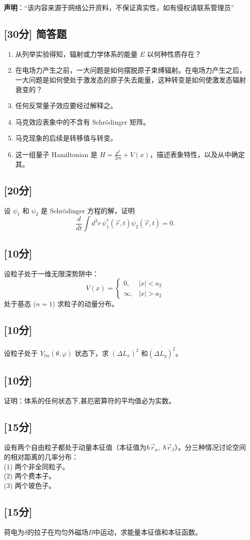 
\textbf{声明}：“该内容来源于网络公开资料，不保证真实性，如有侵权请联系管理员”

\subsection{[30分] 简答题}
 \begin{enumerate}
        \item 从列举实验得知，辐射或力学体系的能量 $E$ 以何种性质存在？
        \item 在电场力产生之前，一大问题是如何摆脱原子束缚辐射。在电场力产生之后，一大问题是如何使处于激发态的原子失去能量，这种转变是如何使激发态辐射衰变的？
        \item 任何反常量子效应要经过解释之。
        \item 马克效应表象中的不含有 Schrödinger 矩阵。
        \item 马克现象的后续是转移值与转变。
        \item 这一组量子 Hamiltonian 是 $H = \frac{p^2}{2m} + V(x)$，描述表象特性，以及从中确定其。
    \end{enumerate}

\subsection{[20分]}
设 $\psi_1$ 和 $\psi_2$ 是 Schrödinger 方程的解，证明
\[
\frac{d}{dt} \int d^3r \, \psi_1^* (\vec{r}, t) \psi_2 (\vec{r}, t) = 0.~
\]

\subsection{[10分]}
设粒子处于一维无限深势阱中：
\[
V(x) =
\begin{cases}
0, & |x| < a_2 \\
\infty, & |x| > a_2
\end{cases}~
\]
处于基态 ($n=1$) 求粒子的动量分布。

\subsection{[10分]}
设粒子处于 $Y_{lm}(\theta, \varphi)$ 状态下，求 $\overline{(\Delta L_x)^2}$ 和$\overline{(\Delta L_y)^2}$。

\subsection{[10分]}
证明：体系的任何状态下,甚厄密算符的平均值必为实数。

\subsection{[15分]}
设有两个自由粒子都处于动量本征值（本征值为$\hbar \vec{r}_\alpha, \ \hbar \vec{r}_\beta$）。分三种情况讨论空间的相对距离的几率分布：\\
(1) 两个非全同粒子。\\
(2) 两个费本子。\\
(3) 两个玻色子。

\subsection{[15分]}
荷电为$\delta$的拉子在均匀外磁场$B$中运动，求能量本征值和本征函数。
